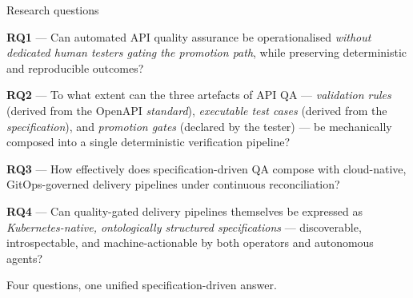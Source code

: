 \documentclass[11pt,aspectratio=169]{beamer}
\begin{document}
\begin{frame}{Research questions}

\footnotesize
\textbf{RQ1} --- Can automated API quality assurance be operationalised \emph{without dedicated human testers gating the promotion path}, while preserving deterministic and reproducible outcomes?

\vspace{0.6em}
\textbf{RQ2} --- To what extent can the three artefacts of API QA --- \emph{validation rules}
(derived from the OpenAPI \emph{standard}), \emph{executable test cases} (derived from the \emph{specification}),
and \emph{promotion gates} (declared by the tester) --- be mechanically composed into a single
deterministic verification pipeline?

\vspace{0.6em}
\textbf{RQ3} --- How effectively does specification-driven QA compose with cloud-native, GitOps-governed delivery pipelines under continuous reconciliation?

\vspace{0.6em}
\textbf{RQ4} --- Can quality-gated delivery pipelines themselves be expressed as \emph{Kubernetes-native, ontologically structured specifications} --- discoverable, introspectable, and machine-actionable by both operators and autonomous agents?

\vspace{0.8em}
\begin{center}
\alert{Four questions, one unified specification-driven answer.}
\end{center}

\end{frame}
\end{document}
